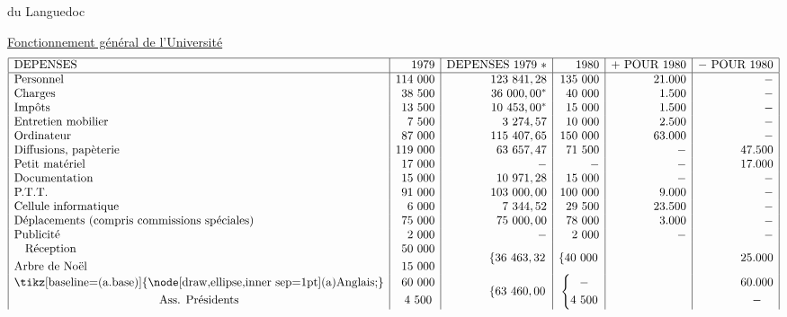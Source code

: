 du Languedoc

\uline{Fonctionnement général de l'Université}
\[
\begin{array}{|l|r|r|r|r|r|}\hline
\text{DEPENSES}&1979&\text{DEPENSES }1979\ *&1980&+\ \text{POUR }1980&-\ \text{POUR }1980\\\hline
\text{Personnel}&114\ 000&123\ 841,28&135\ 000&21.000&-\\
\text{Charges}&38\ 500&36\ 000,00^*&40\ 000&1.500&-\\
\text{Impôts}&13\ 500&10\ 453,00^*&15\ 000&1.500&-\\
\text{Entretien mobilier}&7\ 500&3\ 274,57&10\ 000&2.500&-\\
\text{Ordinateur}&87\ 000&115\ 407,65&150\ 000&63.000&-\\
\text{Diffusions, papèterie}&119\ 000&63\ 657,47&71\ 500&-&47.500\\
\text{Petit matériel}&17\ 000&-&-&-&17.000\\
\text{Documentation}&15\ 000&10\ 971,28&15\ 000&-&-\\
\text{P.T.T.}&91\ 000&103\ 000,00&100\ 000&9.000&-\\
\text{Cellule informatique}&6\ 000&7\ 344,52&29\ 500&23.500&-\\
\text{Déplacements (compris commissions spéciales)}&75\ 000&75\ 000,00&78\ 000&3.000&-\\
\text{Publicité}&2\ 000&-&2\ 000&-&-\\
\begin{gathered}\text{Réception}\\\text{Arbre de Noël}\end{gathered}&\begin{gathered}50\ 000\\15\ 000\end{gathered}&\left\{36\ 463,32\right.&\left\{40\ 000\right.&&25.000\\
\begin{gathered}\text{\tikz[baseline=(a.base)]{\node[draw,ellipse,inner sep=1pt](a){Anglais};}}\\\text{Ass. Présidents}\end{gathered}&\begin{gathered}60\ 000\\4\ 500\end{gathered}&\left\{63\ 460,00\right.&\left\{\begin{gathered}-\\4\ 500\end{gathered}\right.&&\begin{gathered}60.000\\-\end{gathered}\\

\end{array}\]

